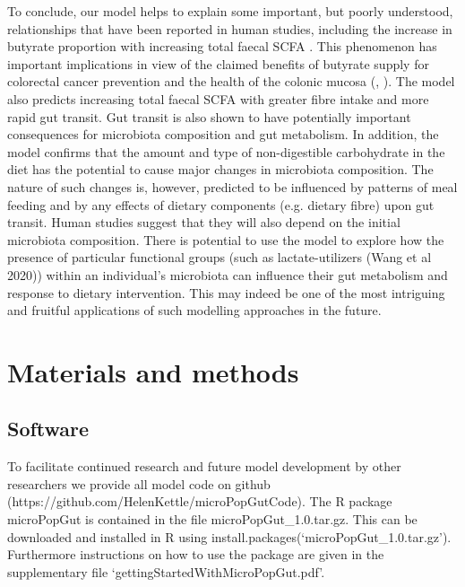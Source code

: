 \documentclass[a4paper]{article}
\begin{document}
To conclude, our model helps to explain some important, but poorly understood, relationships that have been reported in human studies, including the increase in butyrate proportion with increasing total faecal SCFA \citep{labouyer}. This phenomenon has important implications in view of the claimed benefits of butyrate supply for colorectal cancer prevention and the health of the colonic mucosa (\cite{louis2014}, \cite{hamer2008}). 
The model also predicts increasing total faecal SCFA with greater fibre intake and more rapid gut transit.
Gut transit is also shown to have potentially important consequences for microbiota composition and gut metabolism. In addition, the model confirms that the amount and type of non-digestible carbohydrate in the diet has the potential to cause major changes in microbiota composition. 
The nature of such changes is, however, predicted to be influenced by patterns of meal feeding and by any effects of dietary components (e.g. dietary fibre) upon gut transit. 
Human studies suggest that they will also depend on the initial microbiota composition. 
There is potential to use the model to explore how the presence of particular functional groups (such as lactate-utilizers (Wang et al 2020)) within an individual's microbiota can influence their gut metabolism and response to dietary intervention. This may indeed be one of the most intriguing and fruitful applications of such modelling approaches in the future.

\section*{Materials and methods}

\subsection*{Software}
To facilitate continued research and future model development by other researchers we provide all model code on github (https://github.com/HelenKettle/microPopGutCode). The R package microPopGut is contained in the file microPopGut\_1.0.tar.gz. This can be downloaded and installed in R using install.packages(`microPopGut\_1.0.tar.gz'). Furthermore instructions on how to use the package are given in the supplementary file `gettingStartedWithMicroPopGut.pdf'.
\end{document}
